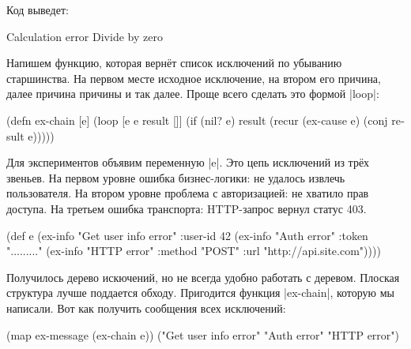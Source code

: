 \noindent
Код выведет:

\begin{english}
  \begin{text}
Calculation error
Divide by zero
  \end{text}
\end{english}

Напишем функцию, которая верн\"{е}т список исключений по убыванию
старшинства. На первом месте исходное исключение, на втором его причина, далее
причина причины и так далее. Проще всего сделать это формой \spverb|loop|:


\begin{english}
  \begin{clojure}
(defn ex-chain [e]
  (loop [e e
         result []]
    (if (nil? e)
      result
      (recur (ex-cause e) (conj result e)))))
  \end{clojure}
\end{english}

Для экспериментов объявим переменную \spverb|e|. Это цепь исключений из тр\"{е}х
звеньев. На первом уровне ошибка бизнес-логики: не удалось извлечь
пользователя. На втором уровне проблема с авторизацией: не хватило прав
доступа. На третьем ошибка транспорта: HTTP-запрос вернул статус 403.

\label{e-sample}

\begin{english}
  \begin{clojure}
(def e
  (ex-info
   "Get user info error"
   {:user-id 42}
   (ex-info "Auth error"
            {:token "........."}
            (ex-info "HTTP error"
                     {:method "POST"
                      :url "http://api.site.com"}))))
  \end{clojure}
\end{english}


Получилось дерево искючений, но не всегда удобно работать с деревом. Плоская
структура лучше поддается обходу. Пригодится функция \spverb|ex-chain|, которую
мы написали. Вот как получить сообщения всех исключений:

\begin{english}
  \begin{clojure}
(map ex-message (ex-chain e))
("Get user info error" "Auth error" "HTTP error")
  \end{clojure}
\end{english}

